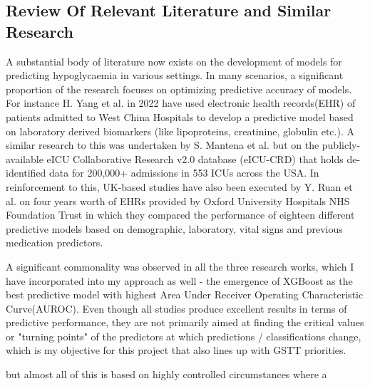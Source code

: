 \subsection{Review Of Relevant Literature and Similar Research}

\noindent A substantial body of literature now exists on the development of models for predicting hypoglycaemia in various settings. In many scenarios, a significant proportion of the research focuses on optimizing predictive accuracy of models. For instance H. Yang et al. in 2022 \cite{yangHaoJMIRMedicalInformatics} have used electronic health records(EHR) of patients admitted to West China Hospitals to develop a predictive model based on laboratory derived biomarkers (like lipoproteins, creatinine, globulin etc.).  A similar research to this was undertaken by S. Mantena et al. \cite{sMantenaCriticallyIll}  but on the publicly-available eICU Collaborative Research v2.0 database (eICU-CRD) that holds de-identified data for 200,000+ admissions in 553 ICUs across the USA. In reinforcement to this, UK-based studies have also been executed by Y. Ruan et al. \cite{yRuanOxfordHypoRiskPred} on four years worth of EHRs provided by Oxford University Hospitals NHS Foundation Trust in which they compared the performance of eighteen different predictive models based on demographic, laboratory, vital signs and previous medication predictors.  

\vspace{5pt}
\noindent A significant commonality was observed in all the three research works, which I have incorporated into my approach as well - the emergence of XGBoost as the best predictive model with highest Area Under Receiver Operating Characteristic Curve(AUROC). Even though all studies produce excellent results in terms of predictive performance, they are not primarily aimed at finding the critical values or "turning points" of the predictors at which predictions / classifications change, which is my objective for this project that also lines up with GSTT priorities.

but almost all of this is based on highly controlled circumstances where a   












